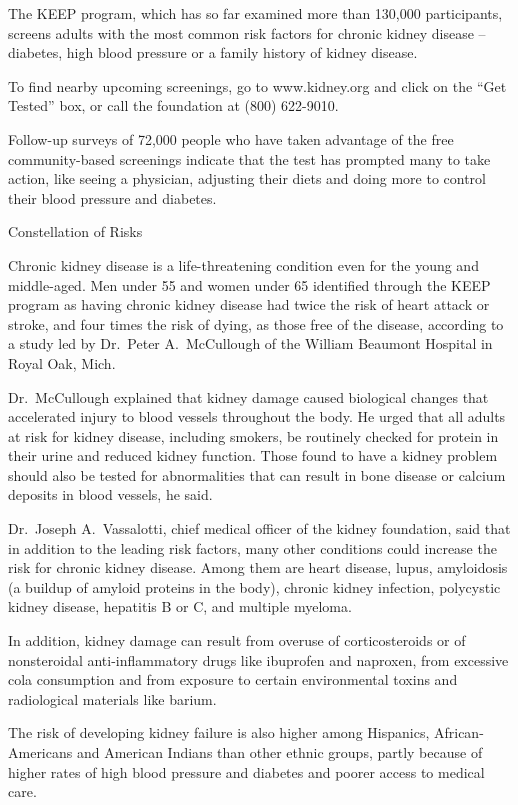 ﻿\documentclass[12pt]{article}
\begin{document}
The KEEP program, which has so far examined more than 130,000 participants, screens adults with the
most common risk factors for chronic kidney disease -- diabetes, high blood pressure or a family
history of kidney disease.

To find nearby upcoming screenings, go to www.kidney.org and click on the ``Get Tested'' box, or
call the foundation at (800) 622-9010.

Follow-up surveys of 72,000 people who have taken advantage of the free community-based screenings
indicate that the test has prompted many to take action, like seeing a physician, adjusting their
diets and doing more to control their blood pressure and diabetes.

Constellation of Risks

Chronic kidney disease is a life-threatening condition even for the young and middle-aged. Men under
55 and women under 65 identified through the KEEP program as having chronic kidney disease had twice
the risk of heart attack or stroke, and four times the risk of dying, as those free of the disease,
according to a study led by Dr.~Peter A.~McCullough of the William Beaumont Hospital in Royal Oak,
Mich.

Dr.~McCullough explained that kidney damage caused biological changes that accelerated injury to
blood vessels throughout the body. He urged that all adults at risk for kidney disease, including
smokers, be routinely checked for protein in their urine and reduced kidney function. Those found to
have a kidney problem should also be tested for abnormalities that can result in bone disease or
calcium deposits in blood vessels, he said.

Dr.~Joseph A.~Vassalotti, chief medical officer of the kidney foundation, said that in addition to
the leading risk factors, many other conditions could increase the risk for chronic kidney disease.
Among them are heart disease, lupus, amyloidosis (a buildup of amyloid proteins in the body),
chronic kidney infection, polycystic kidney disease, hepatitis B or C, and multiple myeloma.

In addition, kidney damage can result from overuse of corticosteroids or of nonsteroidal
anti-inflammatory drugs like ibuprofen and naproxen, from excessive cola consumption and from
exposure to certain environmental toxins and radiological materials like barium.

The risk of developing kidney failure is also higher among Hispanics, African-Americans and American
Indians than other ethnic groups, partly because of higher rates of high blood pressure and diabetes
and poorer access to medical care.
\end{document}
